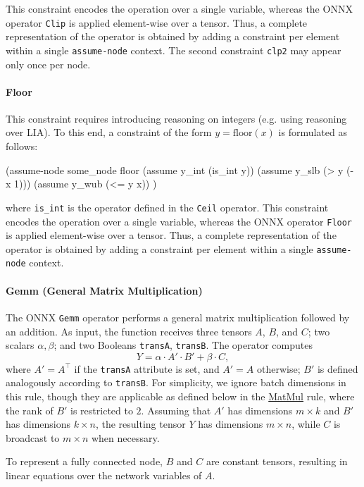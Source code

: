 \noindent This constraint encodes the operation over a single variable, whereas the ONNX operator \texttt{Clip} is applied element-wise over a tensor. 
Thus, a complete representation of the operator is obtained by adding a constraint per element within a single \texttt{assume-node} context. The second constraint \texttt{clp2} may appear only once per node.

\paragraph{Floor}
This constraint requires introducing reasoning on integers (e.g. using reasoning over LIA). To this end, a constraint of the form 
$y = \mathrm{floor}(x)$ is formulated as follows: 

\begin{code}[style=lbnf]
(assume-node some_node floor
    (assume y_int (is_int y))
    (assume y_slb (> y (- x 1)))
    (assume y_wub (<= y x))
)
\end{code} 

where \texttt{is\_int} is the operator defined in the \texttt{Ceil} operator.
This constraint encodes the operation over a single variable, whereas the ONNX operator \texttt{Floor} is applied element-wise over a tensor. 
Thus, a complete representation of the operator is obtained by adding a constraint per element within a single \texttt{assume-node} context.

\paragraph{Gemm (General Matrix Multiplication)}
The ONNX \texttt{Gemm} operator performs a general matrix multiplication followed by an addition. As input, the function receives three tensors $A$, $B$, and $C$; two scalars $\alpha, \beta$; and two Booleans \texttt{transA}, \texttt{transB}. The operator computes
\[
Y = \alpha \cdot A'\cdot B' + \beta \cdot C,
\]
where $A'=A^\top$ if the \texttt{transA} attribute is set, and $A'=A$ otherwise; $B'$ is defined analogously according to \texttt{transB}. For simplicity, we ignore batch dimensions in this rule, though they are applicable as defined below in the \hyperref[rule:matmul]{MatMul} rule, where the rank of $B'$ is restricted to $2$.
Assuming that $A'$ has dimensions $m\times k$ and $B'$
has dimensions $k\times n$, the resulting tensor $Y$ has dimensions $m\times n$, while $C$ is broadcast to $m\times n$ when necessary.

To represent a fully connected node, $B$ and $C$ are constant tensors, resulting in linear equations over the network variables of $A$.

